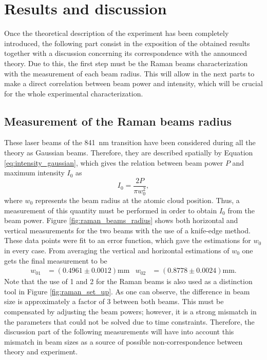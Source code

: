 
\chapter{Results and discussion}
\label{chap:results_and_discussion}

Once the theoretical description of the experiment has been completely introduced, the following part consist in the exposition of the obtained results together with a discussion concerning its correspondence with the announced theory. Due to this, the first step must be the Raman beams characterization with the measurement of each beam radius. This will allow in the next parts to make a direct correlation between beam power and intensity, which will be crucial for the whole experimental characterization.

\section{Measurement of the Raman beams radius}

These laser beams of the \SI{841}{\nano\meter} transition have been considered during all the theory as Gaussian beams. Therefore, they are described spatially by Equation \eqref{eq:intensity_gaussian}, which gives the relation between beam power $P$ and maximum intensity $I_{0}$ as
\begin{equation}
	I_0 = \frac{2P}{\pi w_0^2},
\end{equation}
where $w_0$ represents the beam radius at the atomic cloud position. Thus, a measurement of this quantity must be performed in order to obtain $I_0$ from the beam power. Figure \ref{fig:raman_beams_radius} shows both horizontal and vertical measurements for the two beams with the use of a knife-edge method. These data points were fit to an error function, which gave the estimations for $w_0$ in every case. From averaging the vertical and horizontal estimations of $w_0$ one gets the final measurement to be
\begin{align*}
	w_{01} &= (0.4961\pm0.0012)\si{\milli\meter}   &   w_{02} &= (0.8778\pm0.0024)\si{\milli\meter}.
\end{align*}
Note that the use of 1 and 2 for the Raman beams is also used as a distinction tool in Figure \ref{fig:raman_set_up}. As one can observe, the difference in beam size is approximately a factor of 3 between both beams. This must be compensated by adjusting the beam powers; however, it is a strong mismatch in the parameters that could not be solved due to time constraints. Therefore, the discussion part of the following measurements will have into account this mismatch in beam sizes as a source of possible non-correspondence between theory and experiment.

